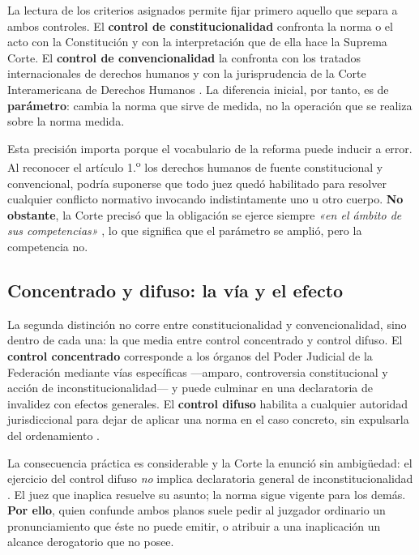 \documentclass[
  spanish,
  letterpaper, oneside
]{article}
\begin{document}
La lectura de los criterios asignados permite fijar primero aquello que separa a
ambos controles. El \textbf{control de constitucionalidad} confronta la norma o el
acto con la Constitución y con la interpretación que de ella hace la Suprema Corte.
El \textbf{control de convencionalidad} la confronta con los tratados
internacionales de derechos humanos y con la jurisprudencia de la Corte
Interamericana de Derechos Humanos \citep{scjnTesis2001605}. La diferencia inicial,
por tanto, es de \textbf{parámetro}: cambia la norma que sirve de medida, no la
operación que se realiza sobre la norma medida.

Esta precisión importa porque el vocabulario de la reforma puede inducir a error. Al
reconocer el artículo 1.\textsuperscript{o} los derechos humanos de fuente
constitucional y convencional, podría suponerse que todo juez quedó habilitado para
resolver cualquier conflicto normativo invocando indistintamente uno u otro cuerpo.
\textbf{No obstante}, la Corte precisó que la obligación se ejerce siempre
\textit{«en el ámbito de sus competencias»} \citep{scjnTesis2005056}, lo que
significa que el parámetro se amplió, pero la competencia no.

\subsection{Concentrado y difuso: la vía y el efecto}

La segunda distinción no corre entre constitucionalidad y convencionalidad, sino
dentro de cada una: la que media entre control concentrado y control difuso. El
\textbf{control concentrado} corresponde a los órganos del Poder Judicial de la
Federación mediante vías específicas —amparo, controversia constitucional y acción
de inconstitucionalidad— y puede culminar en una declaratoria de invalidez con
efectos generales. El \textbf{control difuso} habilita a cualquier autoridad
jurisdiccional para dejar de aplicar una norma en el caso concreto, sin expulsarla
del ordenamiento \citep{scjnTesis2005720}.

La consecuencia práctica es considerable y la Corte la enunció sin ambigüedad: el
ejercicio del control difuso \textit{no} implica declaratoria general de
inconstitucionalidad \citep{scjnTesis2005057}. El juez que inaplica resuelve su
asunto; la norma sigue vigente para los demás. \textbf{Por ello}, quien confunde
ambos planos suele pedir al juzgador ordinario un pronunciamiento que éste no puede
emitir, o atribuir a una inaplicación un alcance derogatorio que no posee.
\end{document}
